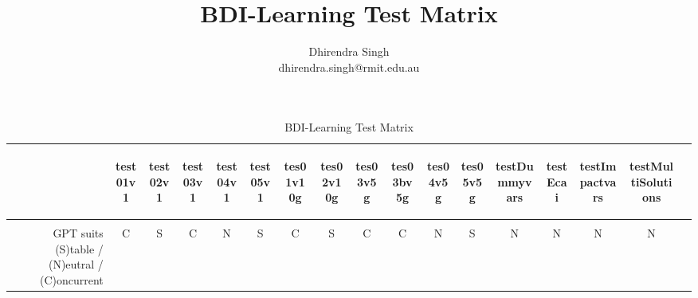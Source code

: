 \documentclass[landscape,a4paper,title page]{article}
\title{BDI-Learning Test Matrix}
\author{
Dhirendra Singh\\ 
dhirendra.singh@rmit.edu.au\\
}
\begin{document}
\maketitle

\begin{table}[!htb]
  \caption{BDI-Learning Test Matrix}
  \begin{tabular}{ r | c  c  c  c  c  c  c  c  c  c  c  c  c  c  c  c }
  \begin{turn}{60}\end{turn} &
  \begin{turn}{60} test01v1 \end{turn} &
  \begin{turn}{60} test02v1 \end{turn} &
  \begin{turn}{60} test03v1 \end{turn} &
  \begin{turn}{60} test04v1 \end{turn} &
  \begin{turn}{60} test05v1 \end{turn} &
  \begin{turn}{60} tes01v10g \end{turn} &
  \begin{turn}{60} tes02v10g\end{turn} &
  \begin{turn}{60} tes03v5g \end{turn} &
  \begin{turn}{60} tes03bv5g \end{turn} &
  \begin{turn}{60} tes04v5g \end{turn} &
  \begin{turn}{60} tes05v5g \end{turn} &
  \begin{turn}{60} testDummyvars \end{turn} &
  \begin{turn}{60} testEcai \end{turn} &
  \begin{turn}{60} testImpactvars \end{turn} &
  \begin{turn}{60} testMultiSolutions \end{turn}
  \\ \hline \\
  GPT suits (S)table / (N)eutral / (C)oncurrent & C & S & C & N & S & C & S & C & C & N & S & N & N & N & N \\

\end{tabular}
\end{table}
\end{document}
